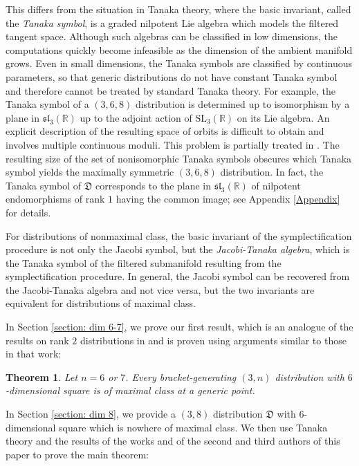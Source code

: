 \documentclass[11pt,letterpaper]{amsart}
\newtheorem{theorem}{Theorem}[section]
\numberwithin{equation}{section}
\begin{document}
This differs from the situation in Tanaka theory, where the basic invariant, called the \textit{Tanaka symbol}, is a graded nilpotent Lie algebra which models the filtered tangent space. Although such algebras can be classified in low dimensions, the computations quickly become infeasible as the dimension of the ambient manifold grows. Even in small dimensions, the Tanaka symbols are classified by continuous parameters, so that generic distributions do not have constant Tanaka symbol and therefore cannot be treated by standard Tanaka theory. For example, the Tanaka symbol of a $(3,6,8)$ distribution is determined up to isomorphism by a plane in $\mathfrak{sl}_3(\mathbb R)$ up to the adjoint action of $\mathrm{SL}_3(\mathbb R)$ on its Lie algebra. An explicit description of the resulting space of orbits is difficult to obtain and involves multiple continuous moduli. This problem is partially treated in \cite{Procesi1976, Formanek1979, Teranishi1986}. The resulting size of the set of nonisomorphic Tanaka symbols obscures which Tanaka symbol yields the maximally symmetric $(3,6,8)$ distribution. In fact, the Tanaka symbol of $\mathfrak D$ corresponds to the plane in $\mathfrak{sl}_3(\mathbb R)$ of nilpotent endomorphisms of rank $1$ having the common image; see Appendix \ref{Appendix} for details.


For distributions of nonmaximal class, the basic invariant of the symplectification procedure is not only the Jacobi symbol, but the \textit{Jacobi-Tanaka algebra}, which is the Tanaka symbol of the filtered submanifold resulting from the symplectification procedure. In general, the Jacobi symbol can be recovered from the Jacobi-Tanaka algebra and not vice versa, but the two invariants are equivalent for distributions of maximal class.

In Section \ref{section: dim 6-7}, we prove our first result, which is an analogue of the results on rank $2$ distributions in \cite{day2025canonicalframes} and is proven using arguments similar to those in that work:
\begin{theorem}
    \label{Thm: (3,6) and (3,7)}
    Let $n=6$ or $7$. Every bracket-generating $(3,n)$ distribution with $6$-dimensional square is of maximal class at a generic point.
\end{theorem}

In Section \ref{section: dim 8}, we provide a $(3,8)$ distribution $\mathfrak D$ with $6$-dimensional square which is nowhere of maximal class. We then use Tanaka theory and the results of the works \cite{doubrov2008rank3} and \cite{doubrov2025large} of the second and third authors of this paper to prove the main theorem:
\end{document}

